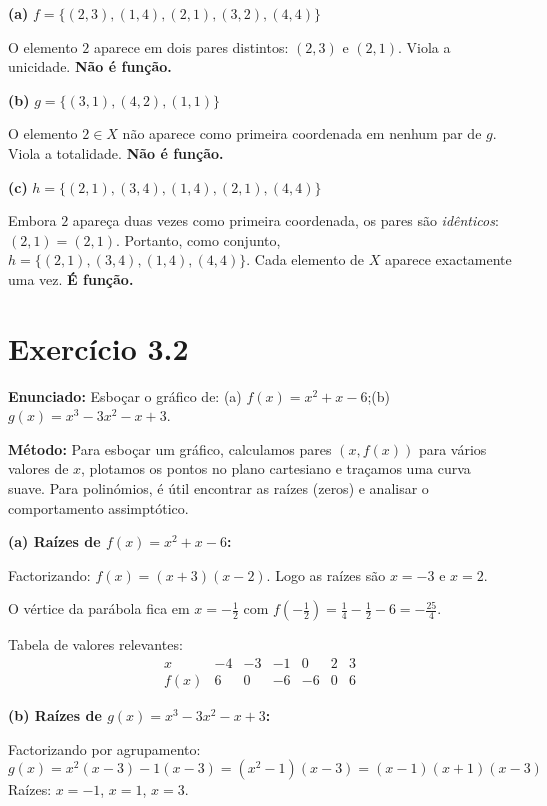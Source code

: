 \documentclass[12pt,a4paper]{article}
\begin{document}
\textbf{(a)} $f = \{(2,3),(1,4),(2,1),(3,2),(4,4)\}$

O elemento $2$ aparece em dois pares distintos: $(2,3)$ e $(2,1)$. Viola a unicidade. \textbf{Não é função.}

\textbf{(b)} $g = \{(3,1),(4,2),(1,1)\}$

O elemento $2 \in X$ não aparece como primeira coordenada em nenhum par de $g$. Viola a totalidade. \textbf{Não é função.}

\textbf{(c)} $h = \{(2,1),(3,4),(1,4),(2,1),(4,4)\}$

Embora $2$ apareça duas vezes como primeira coordenada, os pares são \emph{idênticos}: $(2,1) = (2,1)$. Portanto, como conjunto, $h = \{(2,1),(3,4),(1,4),(4,4)\}$. Cada elemento de $X$ aparece exactamente uma vez. \textbf{É função.}

\section*{Exercício 3.2}

\textbf{Enunciado:} Esboçar o gráfico de: (a) $f(x) = x^2 + x - 6$;\quad (b) $g(x) = x^3 - 3x^2 - x + 3$.

\begin{teoribox}
\textbf{Método:} Para esboçar um gráfico, calculamos pares $(x, f(x))$ para vários valores de $x$, plotamos os pontos no plano cartesiano e traçamos uma curva suave. Para polinómios, é útil encontrar as raízes (zeros) e analisar o comportamento assimptótico.
\end{teoribox}

\textbf{(a) Raízes de $f(x) = x^2 + x - 6$:}

Factorizando: $f(x) = (x+3)(x-2)$. Logo as raízes são $x = -3$ e $x = 2$.

O vértice da parábola fica em $x = -\frac{1}{2}$ com $f(-\frac{1}{2}) = \frac{1}{4} - \frac{1}{2} - 6 = -\frac{25}{4}$.

Tabela de valores relevantes:
\[
\begin{array}{c|cccccc}
x & -4 & -3 & -1 & 0 & 2 & 3 \\\hline
f(x) & 6 & 0 & -6 & -6 & 0 & 6
\end{array}
\]

\textbf{(b) Raízes de $g(x) = x^3 - 3x^2 - x + 3$:}

Factorizando por agrupamento:
\[
g(x) = x^2(x-3) - 1(x-3) = (x^2-1)(x-3) = (x-1)(x+1)(x-3)
\]
Raízes: $x = -1$, $x = 1$, $x = 3$.
\end{document}

